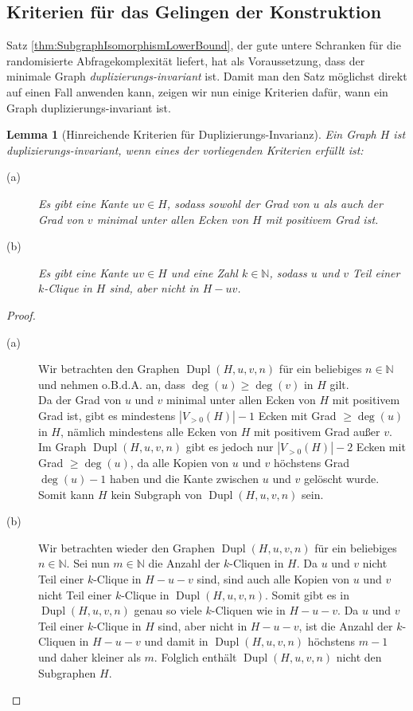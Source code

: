 \documentclass[10pt,a4paper, footheight=1mm]{scrreprt}
\newtheorem{Lemma}[definition]{Lemma}
\theoremstyle{definition}
\DeclareMathOperator\Dupl{Dupl}
\begin{document}
\subsection{Kriterien für das Gelingen der Konstruktion}
Satz \ref{thm:SubgraphIsomorphismLowerBound}, der gute
untere Schranken für die randomisierte Abfragekomplexität
liefert, hat als Voraussetzung, dass der minimale Graph
\emph{duplizierungs-invariant} ist. Damit man den 
Satz möglichst direkt auf einen Fall anwenden kann, 
zeigen wir nun einige Kriterien dafür, wann ein
Graph duplizierungs-invariant ist.
\begin{Lemma}[Hinreichende Kriterien für Duplizierungs-Invarianz]
\label{thm:KriterienDuplizierungsInvariant}
Ein Graph $H$ ist duplizierungs-invariant, wenn eines
der vorliegenden Kriterien erfüllt ist:
\begin{description}
\item[(a)] Es gibt eine Kante $uv\in H$, sodass sowohl
           der Grad von $u$ als auch der Grad von $v$
           minimal unter allen Ecken von $H$ mit positivem
           Grad ist.
\item[(b)] Es gibt eine Kante $uv \in H$ und eine Zahl
           $k\in \mathbb{N}$, sodass $u$ und $v$
           Teil einer $k$-Clique in $H$ sind, aber nicht
           in $H-uv$.
\end{description}
\end{Lemma}
\begin{proof}
\hfill
\begin{description}
\item[(a)] Wir betrachten den Graphen $\Dupl(H,u,v,n)$ für ein
           beliebiges $n\in \mathbb{N}$ und
           nehmen o.B.d.A. an, dass $\deg(u) \geq \deg(v)$ in $H$
           gilt. \\
           Da der Grad von $u$ und $v$ minimal unter allen
           Ecken von $H$ mit positivem Grad ist, gibt es
           mindestens $|V_{>0}(H)| - 1$ Ecken mit Grad $\geq \deg(u)$ in $H$,
           nämlich mindestens alle Ecken von $H$ mit positivem Grad
           außer $v$.
           Im Graph $\Dupl(H,u,v,n)$ gibt es jedoch nur 
           $|V_{>0}(H)|-2$ Ecken mit Grad $\geq \deg(u)$, da alle
           Kopien von $u$ und $v$ höchstens Grad $\deg(u)-1$ haben
           und die Kante zwischen $u$ und $v$ gelöscht wurde.
           Somit kann $H$ kein Subgraph von $\Dupl(H,u,v,n)$ sein.
\item[(b)] Wir betrachten wieder den Graphen $\Dupl(H,u,v,n)$ für
           ein beliebiges $n\in \mathbb{N}$. Sei nun $m\in \mathbb{N}$
           die Anzahl der $k$-Cliquen in $H$. Da $u$ und $v$ nicht
           Teil einer $k$-Clique in $H-u-v$ sind, sind auch alle
           Kopien von $u$ und $v$ nicht Teil einer $k$-Clique in
           $\Dupl(H,u,v,n)$. Somit gibt es in $\Dupl(H,u,v,n)$ 
           genau so viele $k$-Cliquen wie in $H-u-v$. Da $u$ und
           $v$ Teil einer $k$-Clique in $H$ sind, aber 
           nicht in $H-u-v$, ist die Anzahl der $k$-Cliquen in
           $H-u-v$ und damit in $\Dupl(H,u,v,n)$ höchstens $m-1$
           und daher kleiner als $m$. Folglich enthält $\Dupl(H,u,v,n)$
           nicht den Subgraphen $H$. \qedhere
\end{description}
\end{proof}
\end{document}
